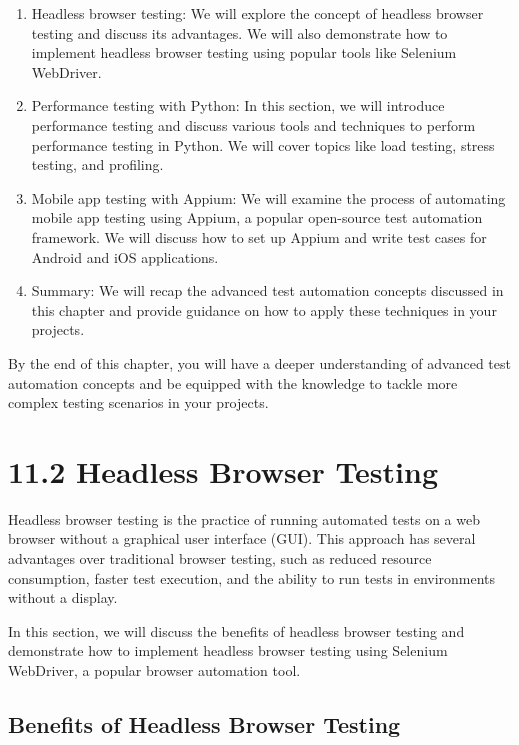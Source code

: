 \documentclass[
  paper=a4,
  ,captions=tableheading
]{scrartcl}
\begin{document}
\begin{enumerate}
\def\labelenumi{\arabic{enumi}.}
\item
  Headless browser testing: We will explore the concept of headless
  browser testing and discuss its advantages. We will also demonstrate
  how to implement headless browser testing using popular tools like
  Selenium WebDriver.
\item
  Performance testing with Python: In this section, we will introduce
  performance testing and discuss various tools and techniques to
  perform performance testing in Python. We will cover topics like load
  testing, stress testing, and profiling.
\item
  Mobile app testing with Appium: We will examine the process of
  automating mobile app testing using Appium, a popular open-source test
  automation framework. We will discuss how to set up Appium and write
  test cases for Android and iOS applications.
\item
  Summary: We will recap the advanced test automation concepts discussed
  in this chapter and provide guidance on how to apply these techniques
  in your projects.
\end{enumerate}

By the end of this chapter, you will have a deeper understanding of
advanced test automation concepts and be equipped with the knowledge to
tackle more complex testing scenarios in your projects.

\hypertarget{headless-browser-testing}{%
\section{11.2 Headless Browser Testing}\label{headless-browser-testing}}

Headless browser testing is the practice of running automated tests on a
web browser without a graphical user interface (GUI). This approach has
several advantages over traditional browser testing, such as reduced
resource consumption, faster test execution, and the ability to run
tests in environments without a display.

In this section, we will discuss the benefits of headless browser
testing and demonstrate how to implement headless browser testing using
Selenium WebDriver, a popular browser automation tool.

\hypertarget{benefits-of-headless-browser-testing}{%
\subsection{Benefits of Headless Browser
Testing}\label{benefits-of-headless-browser-testing}}
\end{document}
